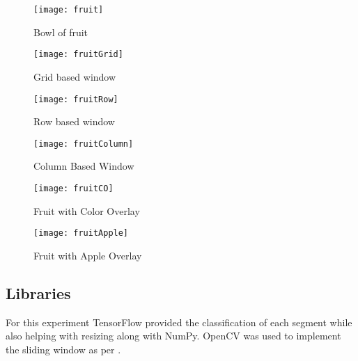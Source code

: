 \begin{figure}[h] 
  \label{fruitBowlManipulations} 
  \begin{minipage}[b]{0.5\linewidth}
    \centering
    \texttt{[image: fruit]}
    \caption{Bowl of fruit \parencite{fruitBowl}}
    \label{fig:fruit}
    \vspace{4ex}
  \end{minipage}%
  \begin{minipage}[b]{0.5\linewidth}
    \centering
    \texttt{[image: fruitGrid]}
	\caption{Grid based window}
    \label{fig:fruitGrid}
    \vspace{4ex}
  \end{minipage} 
  \begin{minipage}[b]{0.5\linewidth}
    \centering
    \texttt{[image: fruitRow]}
    \caption{Row based window}
    \label{fig:fruitRow}
    \vspace{4ex}
  \end{minipage}%
  \begin{minipage}[b]{0.5\linewidth}
    \centering
    \texttt{[image: fruitColumn]}
    \caption{Column Based Window}
    \label{fig:fruitColumn}
    \vspace{4ex}
  \end{minipage}
  \begin{minipage}[b]{0.5\linewidth}
    \centering
    \texttt{[image: fruitCO]}
    \caption{Fruit with Color Overlay}
    \label{fig:fruitOverlay}
    \vspace{4ex}
  \end{minipage}%
  \begin{minipage}[b]{0.5\linewidth}
    \centering
    \texttt{[image: fruitApple]}
    \caption{Fruit with Apple Overlay}
    \label{fig:fruitApple}
    \vspace{4ex}
  \end{minipage}
\end{figure}
\afterpage{\clearpage}

\tocless\subsection{Libraries}
For this experiment TensorFlow provided the classification of each segment while
also helping with resizing along with NumPy. OpenCV was used to implement the
sliding window as per \parencite{slidingWindowTut}.

